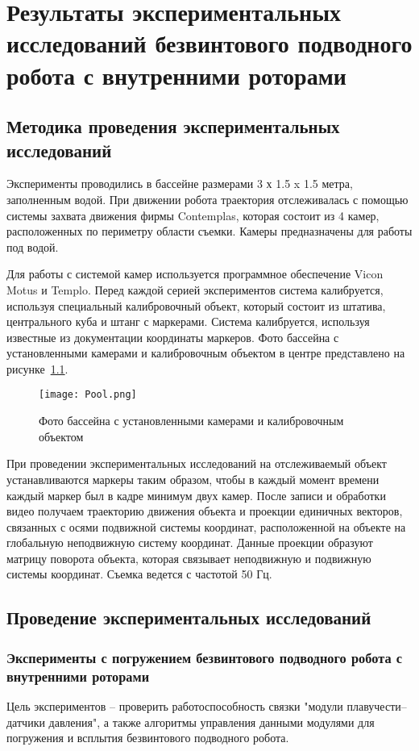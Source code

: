 \chapter{Результаты экспериментальных исследований безвинтового подводного робота с внутренними роторами}\label{ch:ch4}

\section{Методика проведения экспериментальных исследований}\label{sec:ch4/sec1}

Эксперименты проводились в бассейне размерами 3 х 1.5 x 1.5 метра, заполненным водой. При движении робота траектория отслеживалась с помощью системы захвата движения фирмы Contemplas, которая состоит из 4 камер, расположенных по периметру области съемки. Камеры предназначены для работы под водой. 

Для работы с системой камер используется программное обеспечение Vicon Motus и Templo. Перед каждой серией экспериментов система калибруется, используя специальный калибровочный объект, который состоит из штатива, центрального куба и штанг с маркерами. Система калибруется, используя известные из документации координаты маркеров. Фото бассейна с установленными камерами и калибровочным объектом в центре представлено на рисунке~\ref{Pool}.

\begin{figure}[h]
	\centering
	\texttt{[image: Pool.png]}%
	\caption{Фото бассейна с установленными камерами и калибровочным объектом}
	\label{Pool}
\end{figure}

При проведении экспериментальных исследований на отслеживаемый объект устанавливаются маркеры таким образом, чтобы в каждый момент времени каждый маркер был в кадре минимум двух камер. После записи и обработки видео получаем траекторию движения объекта и проекции единичных векторов, связанных с осями подвижной системы координат, расположенной на объекте на глобальную неподвижную систему координат. Данные проекции образуют матрицу поворота объекта, которая связывает неподвижную и подвижную системы координат. Съемка ведется с частотой 50 Гц.

\section{Проведение экспериментальных исследований}\label{subsec:ch4/sec2/sub1}

\subsection{Эксперименты с погружением безвинтового подводного робота с внутренними роторами}
Цель экспериментов -- проверить работоспособность связки "модули плавучести--датчики давления", а также алгоритмы управления данными модулями для погружения и всплытия безвинтового подводного робота.

